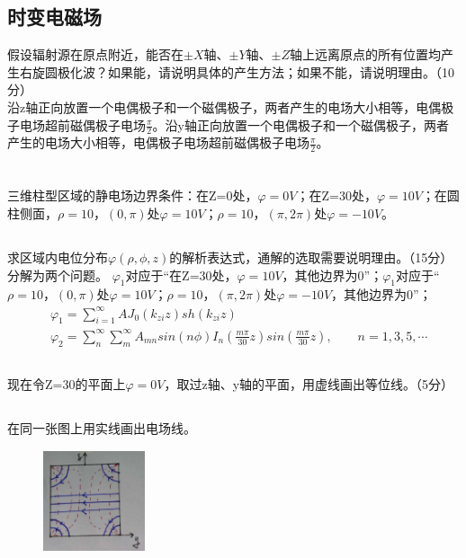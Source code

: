 \documentclass[UTF8]{ctexart}
\begin{document}
\subsection{时变电磁场}
假设辐射源在原点附近，能否在$\pm X$轴、$\pm Y$轴、$\pm Z$轴上远离原点的所有位置均产生右旋圆极化波？如果能，请说明具体的产生方法；如果不能，请说明理由。（10分）\\
沿z轴正向放置一个电偶极子和一个磁偶极子，两者产生的电场大小相等，电偶极子电场超前磁偶极子电场$\frac{\pi}{2}$。沿y轴正向放置一个电偶极子和一个磁偶极子，两者产生的电场大小相等，电偶极子电场超前磁偶极子电场$\frac{\pi}{2}$。
\section{}
三维柱型区域的静电场边界条件：在Z=0处，$\varphi=0V$；在Z=30处，$\varphi=10V$；在圆柱侧面，$\rho=10$，$(0,\pi)$处$\varphi=10V$；$\rho=10$，$(\pi,2\pi)$处$\varphi=-10V$。
\subsection{}
求区域内电位分布$\varphi(\rho,\phi,z)$的解析表达式，通解的选取需要说明理由。（15分）\\
分解为两个问题。
$\varphi_1$对应于“在Z=30处，$\varphi=10V$，其他边界为0”；$\varphi_1$对应于“$\rho=10$，$(0,\pi)$处$\varphi=10V$；$\rho=10$，$(\pi,2\pi)$处$\varphi=-10V$，其他边界为0”；
\begin{equation*}
\begin{aligned}
&\varphi_1=\sum_{i=1}^{\infty}{AJ_0(k_{zi}z)sh(k_{zi}z)}\\
&\varphi_2=\sum_n^{\infty}\sum_m^{\infty}A_{mn}sin(n\phi)I_n(\frac{m\pi}{30}z)sin(\frac{m\pi}{30}z),\quad\quad n=1,3,5,\cdots
\end{aligned}
\end{equation*}
\subsection{}
现在令Z=30的平面上$\varphi=0V$，取过z轴、y轴的平面，用虚线画出等位线。（5分）
\subsection{}
在同一张图上用实线画出电场线。
\begin{figure}[htbp]
\centering
\includegraphics[width=3cm,height=3cm]{2020-3.jpg}
\end{figure}
\end{document}
